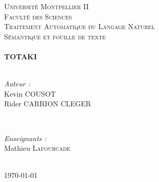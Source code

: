 \begin{titlepage}

\textsc{\LARGE Université Montpellier II \\ Faculté des Sciences}\\[1.5cm]
\textsc{\Large Traitement Automatique du Langage Naturel}\\[0.5cm]
\textsc{\large Sémantique et fouille de texte}\\[0.5cm]


\HRule \\[0.4cm]
{ \huge \bfseries TOTAKI}\\[0.4cm] 
\HRule \\[1.5cm]
 

\begin{minipage}{0.4\textwidth}
  \begin{flushleft} \large
    \emph{Auteur :}\\
    Kevin \textsc{COUSOT}\\
    Rider \textsc{CARRION CLEGER}
  \end{flushleft}
\end{minipage}
~
\begin{minipage}{0.4\textwidth}
  \begin{flushright} \large
    \emph{Enseignants :} \\
    Mathieu \textsc{Lafourcade}
  \end{flushright}
\end{minipage}\\[4cm]


{\large \today}\\[3cm]


\vfill 

\end{titlepage}
